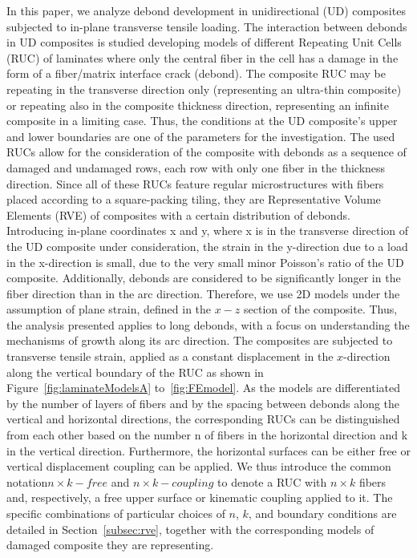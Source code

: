 \documentclass[review]{elsarticle}
\begin{document}
In this paper, we analyze debond development in unidirectional (UD) composites subjected to in-plane transverse tensile loading.  The interaction between debonds in UD composites is studied developing models of different Repeating Unit Cells (RUC) of laminates where only the central fiber in the cell has a damage in the form of a fiber/matrix interface crack (debond). The composite RUC may be repeating in the transverse direction only (representing an ultra-thin composite) or repeating also in the composite thickness direction, representing an infinite composite in a limiting case. Thus, the conditions at the UD composite's upper and lower boundaries are one of the parameters for the investigation.  The used RUCs allow for the consideration of the composite with debonds as a sequence of damaged and undamaged rows, each row with only one fiber in the thickness direction. Since all of these RUCs feature regular microstructures with fibers placed according to a square-packing tiling, they are Representative Volume Elements (RVE) of composites with a certain distribution of debonds. Introducing in-plane coordinates x and y, where x is in the transverse direction of the UD composite under consideration, the strain in the y-direction due to a load in the x-direction is small, due to the very small minor Poisson’s ratio of the UD composite. Additionally, debonds are considered to be significantly longer in the fiber direction than in the arc direction. Therefore, we use 2D models under the assumption of plane strain, defined in the $x-z$ section of the composite.  Thus, the analysis presented applies to long debonds, with a focus on understanding the mechanisms of growth along its arc direction. The composites are subjected to transverse tensile strain, applied as a constant displacement in the $x$-direction along the vertical boundary of the RUC as shown in  Figure~\ref{fig:laminateModelsA} to~\ref{fig:FEmodel}. As the models are differentiated by the number of layers of fibers and by the spacing between debonds along the vertical and horizontal directions, the corresponding RUCs can be distinguished from each other based on the number n of fibers in the horizontal direction and k in the vertical direction. Furthermore, the horizontal surfaces can be either free or vertical displacement coupling can be applied. We thus introduce the common notation$n\times k-free$  and $n\times k-coupling$ to denote a RUC with $n\times k$ fibers and, respectively, a free upper surface or kinematic coupling applied to it. The specific combinations of particular choices of $n$, $k$, and boundary conditions are detailed in Section~\ref{subsec:rve}, together with the corresponding models of damaged composite they are representing.
\end{document}
